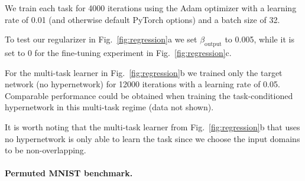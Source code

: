 \documentclass{article}
\begin{document}
We train each task for 4000 iterations using the Adam optimizer with a learning rate of 0.01 (and otherwise default PyTorch options) and a batch size of 32.

To test our regularizer in Fig.~\ref{fig:regression}a we set $\beta_\text{output}$ to 0.005, while it is set to 0 for the fine-tuning experiment in Fig.~\ref{fig:regression}c.

For the multi-task learner in Fig.~\ref{fig:regression}b we trained only the target network (no hypernetwork) for 12000 iterations with a learning rate of 0.05. Comparable performance could be obtained when training the task-conditioned hypernetwork in this multi-task regime (data not shown).

It is worth noting that the multi-task learner from Fig.~\ref{fig:regression}b that uses no hypernetwork is only able to learn the task since we choose the input domains to be non-overlapping.



\paragraph{Permuted MNIST benchmark.}
\end{document}
